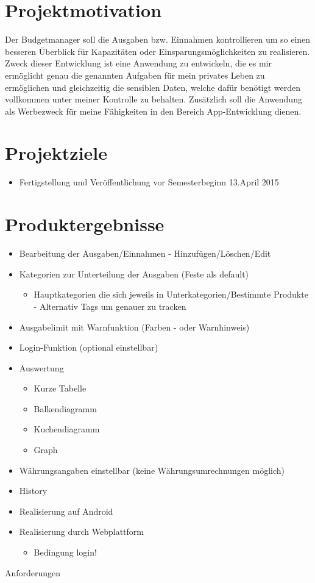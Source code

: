 \section{Projektmotivation}
Der Budgetmanager soll die Ausgaben bzw. Einnahmen kontrollieren um so einen besseren Überblick für Kapazitäten oder Einsparungsmöglichkeiten zu realisieren. Zweck dieser Entwicklung ist eine Anwendung zu entwickeln, die es mir ermöglicht genau die genannten Aufgaben für mein privates Leben zu ermöglichen und gleichzeitig die sensiblen Daten, welche dafür benötigt werden vollkommen unter meiner Kontrolle zu behalten. Zusätzlich soll die Anwendung als Werbezweck für meine Fähigkeiten in den Bereich App-Entwicklung dienen.

\section{Projektziele}
\begin{itemize}
	\item Fertigstellung und Veröffentlichung vor Semesterbeginn  13.April 2015
\end{itemize}

\section{Produktergebnisse}
\begin{itemize}
	\item Bearbeitung der Ausgaben/Einnahmen - Hinzufügen/Löschen/Edit
	\item Kategorien zur Unterteilung der Ausgaben (Feste als default)
		\begin{itemize}
		\item Hauptkategorien die sich jeweils in Unterkategorien/Bestimmte Produkte - Alternativ Tags um genauer zu 	tracken
		\end{itemize}
	\item Ausgabelimit mit Warnfunktion (Farben - oder Warnhinweis)
	\item Login-Funktion (optional einstellbar)
	\item Auswertung
		\begin{itemize}
		\item Kurze Tabelle
		\item Balkendiagramm
		\item Kuchendiagramm
		\item Graph
		\end{itemize}
	\item Währungsangaben einstellbar (keine Währungsumrechnungen möglich)
	\item History 
	\item Realisierung auf Android
	\item Realisierung durch Webplattform
		\begin{itemize}
		\item Bedingung login!
		\end{itemize}
\end{itemize} Anforderungen

